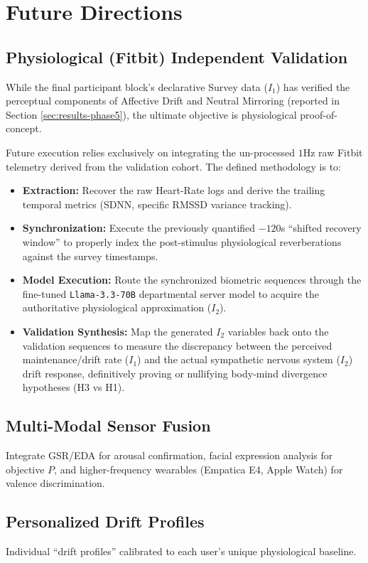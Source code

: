\documentclass[11pt, a4paper]{report}
\begin{document}
\section{Future Directions}
\subsection{Physiological (Fitbit) Independent Validation}
While the final participant block's declarative Survey data ($I_1$) has verified the perceptual components of Affective Drift and Neutral Mirroring (reported in Section \ref{sec:results-phase5}), the ultimate objective is physiological proof-of-concept. 

Future execution relies exclusively on integrating the un-processed $1$Hz raw Fitbit telemetry derived from the validation cohort. The defined methodology is to:
\begin{itemize}
    \item \textbf{Extraction:} Recover the raw Heart-Rate logs and derive the trailing temporal metrics (SDNN, specific RMSSD variance tracking).
    \item \textbf{Synchronization:} Execute the previously quantified $-120$s ``shifted recovery window'' to properly index the post-stimulus physiological reverberations against the survey timestamps.
    \item \textbf{Model Execution:} Route the synchronized biometric sequences through the fine-tuned \texttt{Llama-3.3-70B} departmental server model to acquire the authoritative physiological approximation ($I_2$).
    \item \textbf{Validation Synthesis:} Map the generated $I_2$ variables back onto the validation sequences to measure the discrepancy between the perceived maintenance/drift rate ($I_1$) and the actual sympathetic nervous system ($I_2$) drift response, definitively proving or nullifying body-mind divergence hypotheses (H3 vs H1).
\end{itemize}

\subsection{Multi-Modal Sensor Fusion}
Integrate GSR/EDA for arousal confirmation, facial expression analysis for objective $P$, and higher-frequency wearables (Empatica E4, Apple Watch) for valence discrimination.

\subsection{Personalized Drift Profiles}
Individual ``drift profiles'' calibrated to each user's unique physiological baseline.
\end{document}
